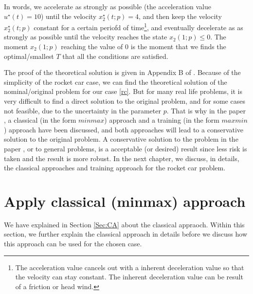 \documentclass  [
  paper    = a4,
  BCOR     = 10mm,
  twoside,
  fontsize = 12pt,
  fleqn,
  toc      = bibnumbered,
  toc      = listofnumbered,
  numbers  = noendperiod,
  headings = normal,
  listof   = leveldown,
  version  = 3.03
]                                       {scrreprt}
\newcommand{\<}{\langle}
\renewcommand{\>}{\rangle}
\begin{document}
In words, we accelerate as strongly as possible (the acceleration value $u^\star(t)=10$) until the velocity $x^\star_2(t;p)=4$, and then keep the velocity $x^\star_2(t;p)$ constant for a certain periofd of time\footnote{The acceleration value cancels out with a inherent deceleration value so that the velocity can stay constant. The inherent deceleration value can be result of a friction or head wind.}, and eventually decelerate as as strongly as possible until the velocity reaches the state $x_2(1;p) \leq 0$. The moment $x_2(1;p)$ reaching the value of $0$ is the moment that we finds the optimal/smallest $T$ that all the conditions are satisfied. 

The proof of the theoretical solution is given in Appendix B of \cite{MatSch22}. Because of the simplicity of the rocket car case, we can find the theoretical solution of the nominal/original problem for our case \ref{rc}. But for many real life problems, it is very difficult to find a direct solution to the original problem, and for some cases not feasible, due to the uncertainty in the parameter $p$. That is why in the paper \cite{MatSch22}, a classical (in the form $minmax$) approach and a training (in the form $maxmin$) approach have been discussed, and both approaches will lead to a conservative solution to the original problem. A conservative solution to the problem in the paper \cite{MatSch22}, or to general problems,  is a acceptable (or desired) result since less risk is taken and the result is more robust. In the next chapter, we discuss, in details, the classical approaches and training approach for the rocket car problem. %


\section{Apply classical (minmax) approach}
We have explained in Section \ref{Sec:CA} about the classical appraoch. Within this section, we further explain the classical approach in details before we discuss how this approach can be used for the chosen case. 
\end{document}

